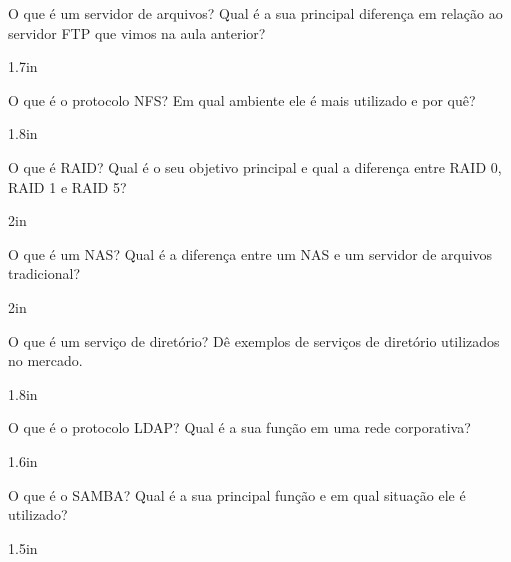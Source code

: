 \documentclass[12pt]{exam}
\begin{document}
	\noindent
\begin{questions}
\question O que é um servidor de arquivos? Qual é a sua principal diferença em relação ao servidor FTP que vimos na aula anterior?

\begin{solutionbox}{1.7in} \end{solutionbox}

\question O que é o protocolo NFS? Em qual ambiente ele é mais utilizado e por quê?

\begin{solutionbox}{1.8in} \end{solutionbox}

\question O que é RAID? Qual é o seu objetivo principal e qual a diferença entre RAID 0, RAID 1 e RAID 5?

\begin{solutionbox}{2in} \end{solutionbox}

\question O que é um NAS? Qual é a diferença entre um NAS e um servidor de arquivos tradicional?

\begin{solutionbox}{2in} \end{solutionbox}

\question O que é um serviço de diretório? Dê exemplos de serviços de diretório utilizados no mercado.

\begin{solutionbox}{1.8in} \end{solutionbox}

\question O que é o protocolo LDAP? Qual é a sua função em uma rede corporativa?

\begin{solutionbox}{1.6in} \end{solutionbox}

\question O que é o SAMBA? Qual é a sua principal função e em qual situação ele é utilizado?

\begin{solutionbox}{1.5in} \end{solutionbox}
	
\end{questions}
	
\end{document}
